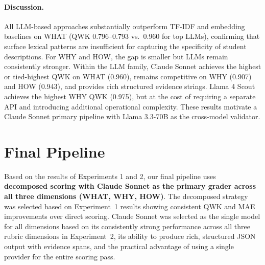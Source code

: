 \documentclass[11pt]{article}
\begin{document}
\paragraph{Discussion.} All LLM-based approaches substantially outperform TF-IDF and embedding baselines on WHAT (QWK 0.796--0.793 vs.\ 0.960 for top LLMs), confirming that surface lexical patterns are insufficient for capturing the specificity of student descriptions. For WHY and HOW, the gap is smaller but LLMs remain consistently stronger. Within the LLM family, Claude Sonnet achieves the highest or tied-highest QWK on WHAT (0.960), remains competitive on WHY (0.907) and HOW (0.943), and provides rich structured evidence strings. Llama 4 Scout achieves the highest WHY QWK (0.975), but at the cost of requiring a separate API and introducing additional operational complexity. These results motivate a Claude Sonnet primary pipeline with Llama 3.3-70B as the cross-model validator.



\section{Final Pipeline}
Based on the results of Experiments 1 and 2, our final pipeline uses \textbf{decomposed scoring with Claude Sonnet as the primary grader across all three dimensions (WHAT, WHY, HOW)}. The decomposed strategy was selected based on Experiment~1 results showing consistent QWK and MAE improvements over direct scoring. Claude Sonnet was selected as the single model for all dimensions based on its consistently strong performance across all three rubric dimensions in Experiment~2, its ability to produce rich, structured JSON output with evidence spans, and the practical advantage of using a single provider for the entire scoring pass.
\end{document}
